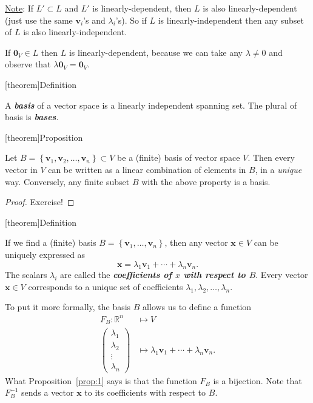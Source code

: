 \documentclass[12pt]{report}
\theoremstyle{definition}
\begin{document}
\underline{Note}: If $L' \subset L$ and $L'$ is linearly-dependent,
then $L$ is also linearly-dependent (just use the same $\pmb{v}_i$'s and $\lambda_i$'s).
So if $L$ is linearly-independent then any subset of $L$ is also linearly-independent.

\begin{ex}
    If $\pmb{0}_V \in L$ then $L$ is linearly-dependent,
    because we can take any $\lambda \neq 0$ and observe that $\lambda \pmb{0}_V = \pmb{0}_V$.
\end{ex}

[theorem]{Definition}
\begin{basis}
    A \textbf{\emph{basis}} of a vector space is a linearly independent spanning set.
    The plural of basis is \textbf{\emph{bases}}.
\end{basis}

[theorem]{Proposition}
\begin{v can be written with element of basis}\label{prop:1}
    Let $B = \left\{\pmb{v}_1, \pmb{v}_2, \ldots, \pmb{v}_n\right\} \subset V$ be a (finite)
    basis of vector space $V$. Then every vector in $V$ can be written as a linear combination
    of elements in $B$, in a \emph{unique} way.
    Conversely, any finite subset $B$ with the above property is a basis.
\end{v can be written with element of basis}

\begin{proof}
    Exercise!
\end{proof}

[theorem]{Definition}
\begin{coefficients of x with respect to B}
    If we find a (finite) basis $B = \left\{\pmb{v}_1,\ldots,\pmb{v}_n\right\} $,
    then any vector $\pmb{x} \in V$ can be uniquely expressed as\[
        \pmb{x} = \lambda_1 \pmb{v}_1 + \cdots + \lambda_n \pmb{v}_n.
    \]The scalars $\lambda_i$ are called the \textbf{\emph{coefficients of $x$ with respect to $B$}}.
    Every vector $\pmb{x}\in V$ corresponds to a unique set of coefficients
    $\lambda_1, \lambda_2, \ldots, \lambda_n$.
\end{coefficients of x with respect to B}
To put it more formally, the basis $B$ allows us to define a function\[
    \begin{align*}
        F_B:\mathbb{R}^{n} & \mapsto V \\
        \begin{pmatrix}
                \lambda_1 \\
                \lambda_2 \\
                \vdots \\
                \lambda_n
            \end{pmatrix} & \mapsto \lambda_1 \pmb{v}_1 + \cdots + \lambda_n \pmb{v}_n.
    \end{align*}
\]
What Proposition~\ref{prop:1} says is that the function $F_B$ is a bijection.
Note that $F_B^{-1}$ sends a vector $\pmb{x}$ to its coefficients with respect to $B$.
\end{document}
